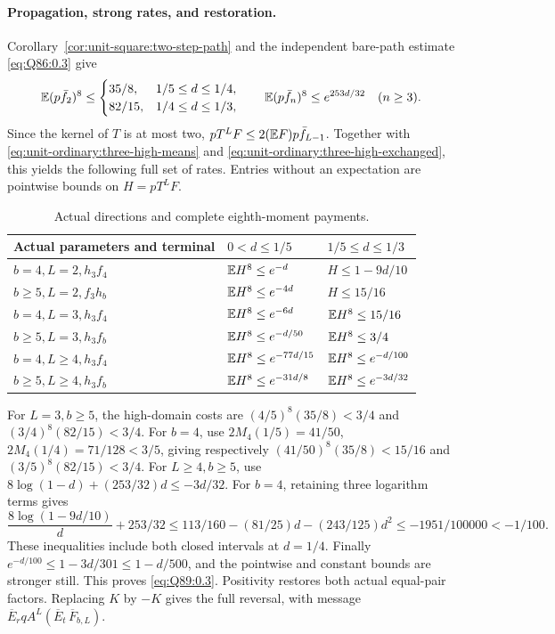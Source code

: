 \paragraph{Propagation, strong rates, and restoration.}
Corollary~\ref{cor:unit-square:two-step-path} and the independent
bare-path estimate \eqref{eq:Q86:0.3} give
\[
 \mathbb E(p\bar f_2)^8\le
 \begin{cases}35/8,&1/5\le d\le1/4,\\82/15,&1/4\le d\le1/3,\end{cases}
 \qquad\mathbb E(p\bar f_n)^8\le e^{253d/32}\quad(n\ge3).
\]
Since the kernel of \(T\) is at most two,
\(pT^LF\le2(\mathbb E F)p\bar f_{L-1}\).
Together with \eqref{eq:unit-ordinary:three-high-means} and
\eqref{eq:unit-ordinary:three-high-exchanged}, this yields the
following full set of rates. Entries without an expectation are
pointwise bounds on \(H=pT^LF\).
\begin{table}[htbp]\centering\small
\caption{Actual directions and complete eighth-moment payments.}
\label{tab:unit-ordinary:three-final}
\begin{tabular}{@{}lll@{}}\toprule
Actual parameters and terminal & \(0<d\le1/5\) & \(1/5\le d\le1/3\)\\\midrule
\(b=4,L=2,h_3f_4\)&\(\mathbb E H^8\le e^{-d}\)&\(H\le1-9d/10\)\\
\(b\ge5,L=2,f_3h_b\)&\(\mathbb E H^8\le e^{-4d}\)&\(H\le15/16\)\\
\(b=4,L=3,h_3f_4\)&\(\mathbb E H^8\le e^{-6d}\)&\(\mathbb E H^8\le15/16\)\\
\(b\ge5,L=3,h_3f_b\)&\(\mathbb E H^8\le e^{-d/50}\)&\(\mathbb E H^8\le3/4\)\\
\(b=4,L\ge4,h_3f_4\)&\(\mathbb E H^8\le e^{-77d/15}\)&\(\mathbb E H^8\le e^{-d/100}\)\\
\(b\ge5,L\ge4,h_3f_b\)&\(\mathbb E H^8\le e^{-31d/8}\)&\(\mathbb E H^8\le e^{-3d/32}\)\\\bottomrule
\end{tabular}
\end{table}
For \(L=3,b\ge5\), the high-domain costs are
\((4/5)^8(35/8)<3/4\) and \((3/4)^8(82/15)<3/4\).
For \(b=4\), use \(2M_4(1/5)=41/50\),
\(2M_4(1/4)=71/128<3/5\), giving respectively
\((41/50)^8(35/8)<15/16\) and \((3/5)^8(82/15)<3/4\).
For \(L\ge4,b\ge5\), use
\(8\log(1-d)+(253/32)d\le-3d/32\).
For \(b=4\), retaining three logarithm terms gives
\[
 \frac{8\log(1-9d/10)}d+253/32
 \le113/160-(81/25)d-(243/125)d^2
 \le-1951/100000<-1/100.
\]
These inequalities include both closed intervals at \(d=1/4\).
Finally \(e^{-d/100}\le1-3d/301\le1-d/500\), and the
pointwise and constant bounds are stronger still. This proves
\eqref{eq:Q89:0.3}. Positivity restores both actual equal-pair factors.
Replacing \(K\) by \(-K\) gives the full reversal, with message
\(\overline E_rqA^L(\overline E_t\,\overline F_{b,L})\).

